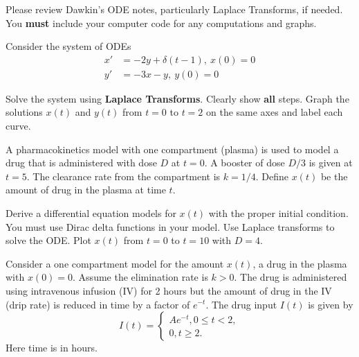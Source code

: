 \documentclass[
	number={4},
	title={Pharmacokinetics}
]{math486homework}
\begin{document}
\maketitle

\noindent Please review Dawkin's ODE notes, particularly Laplace Transforms, if needed.
You \textbf{must} include your computer code for any computations and graphs.

\begin{problems}
	\problem Consider the system of ODEs
	\begin{equation*}
	\begin{aligned}
		x' &= -2y + \delta(t-1),\ x(0) = 0\\
		y' &= -3x - y,\ y(0) = 0
	\end{aligned}
	\end{equation*}
	\begin{problems}
		\subproblem Solve the system using \textbf{Laplace Transforms}.
		Clearly show \textbf{all} steps. 
		\subproblem Graph the solutions $x(t)$ and $y(t)$ from $t=0$ to $t=2$ on the same axes and label each curve. 
	\end{problems}
	\problem A pharmacokinetics model with one compartment (plasma) is used to model a drug that is administered with dose $D$ at $t=0$.
	A booster of dose $D/3$ is given at $t=5$.
	The clearance rate from the compartment is $k=1/4$.
	Define $x(t)$ be the amount of drug in the plasma at time $t$.
	\begin{problems}
		\subproblem Derive a differential equation models for $x(t)$ with the proper initial condition.
		You must use Dirac delta functions in your model. \addanswer{Problem-2a}
		\subproblem Use Laplace transforms to solve the ODE. \addanswer{Problem-2b}
		\subproblem Plot $x(t)$ from $t=0$ to $t=10$ with $D=4$. \addanswer{Problem-2c}
	\end{problems}
	\problem Consider a one compartment model for the amount $x(t)$, a drug in the plasma with $x(0) = 0$.
	Assume the elimination rate is $k > 0$.
	The drug is administered using intravenous infusion (IV) for 2 hours but the amount of drug in the IV (drip rate) is reduced in time by a factor of $e^{-t}$.
	The drug input $I(t)$ is given by
	\[ I(t) = \left\{ \begin{array}{ll}
		Ae^{-t}, 0 \leq t < 2,\\
		0, t \geq 2.
	\end{array} \right. \]
	Here time is in hours.
	\begin{problems}

\end{problems}
\end{problems}
\end{document}
